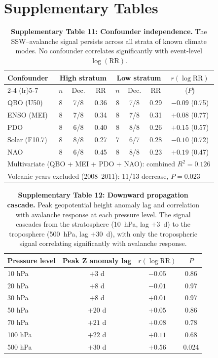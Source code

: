 \documentclass[11pt,letterpaper]{article}
\begin{document}
\section{Supplementary Tables}

\begin{table}[!ht]
\centering
\caption{\textbf{Supplementary Table 11: Confounder independence.}
The SSW--avalanche signal persists across all strata of known climate modes. No confounder correlates significantly with event-level $\log(\mathrm{RR})$.}
\label{tab:confounders}
\small
\begin{tabular}{lccccccc}
\toprule
Confounder & \multicolumn{3}{c}{High stratum} & \multicolumn{3}{c}{Low stratum} & $r(\log\mathrm{RR})$ \\
\cmidrule(lr){2-4} \cmidrule(lr){5-7}
 & $n$ & Dec. & RR & $n$ & Dec. & RR & ($P$) \\
\midrule
QBO (U50) & 8 & 7/8 & 0.36 & 8 & 7/8 & 0.29 & $-0.09$ (0.75) \\
ENSO (MEI) & 8 & 7/8 & 0.34 & 8 & 7/8 & 0.31 & $+0.08$ (0.77) \\
PDO & 8 & 6/8 & 0.40 & 8 & 8/8 & 0.26 & $+0.15$ (0.57) \\
Solar (F10.7) & 8 & 8/8 & 0.27 & 7 & 6/7 & 0.28 & $-0.10$ (0.72) \\
NAO & 8 & 6/8 & 0.45 & 8 & 8/8 & 0.23 & $+0.19$ (0.47) \\
\midrule
\multicolumn{8}{l}{Multivariate (QBO + MEI + PDO + NAO): combined $R^2 = 0.126$} \\
\multicolumn{8}{l}{Volcanic years excluded (2008--2011): 11/13 decrease, $P = 0.023$} \\
\bottomrule
\end{tabular}
\end{table}

\begin{table}[!ht]
\centering
\caption{\textbf{Supplementary Table 12: Downward propagation cascade.}
Peak geopotential height anomaly lag and correlation with avalanche response at each pressure level. The signal cascades from the stratosphere (10~hPa, lag $+3$~d) to the troposphere (500~hPa, lag $+30$~d), with only the tropospheric signal correlating significantly with avalanche response.}
\label{tab:propagation}
\small
\begin{tabular}{lccc}
\toprule
Pressure level & Peak Z anomaly lag & $r(\log\mathrm{RR})$ & $P$ \\
\midrule
10 hPa & $+3$ d & $-0.05$ & 0.86 \\
20 hPa & $+8$ d & $-0.01$ & 0.97 \\
30 hPa & $+8$ d & $+0.01$ & 0.97 \\
50 hPa & $+20$ d & $+0.05$ & 0.86 \\
70 hPa & $+21$ d & $+0.08$ & 0.78 \\
100 hPa & $+22$ d & $+0.11$ & 0.68 \\
500 hPa & $+30$ d & $+0.56$ & 0.024 \\
\bottomrule
\end{tabular}
\end{table}
\end{document}
